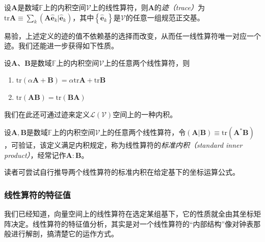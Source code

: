 \documentclass[main.tex]{subfiles}
\begin{document}
\begin{definition}[线性算符的迹]\label{def:II.2.19}
    设$\mathbf{A}$是数域$\mathbb{F}$上的内积空间$\mathcal{V}$上的线性算符，则$\mathbf{A}$的\emph{迹（trace）}为$\mathrm{tr}\mathbf{A}\equiv\sum_k\left(\mathbf{A}\mathbf{\hat{e}}_k|\mathbf{\hat{e}}_k\right)$，其中$\left\{\mathbf{\hat{e}}_k\right\}$是$\mathcal{V}$的任意一组规范正交基。
\end{definition}

易验，上述定义的迹的值不依赖基的选择而改变，从而任一线性算符唯一对应一个迹。我们还能进一步获得如下性质。

\begin{theorem}\label{thm:II.2.25}
    设$\mathbf{A}$、$\mathbf{B}$是数域$\mathbb{F}$上的内积空间$\mathcal{V}$上的任意两个线性算符，则
    \begin{enumerate}
        \item $\mathrm{tr}\left(\alpha\mathbf{A}+\mathbf{B}\right)=\alpha\mathrm{tr}\mathbf{A}+\mathrm{tr}\mathbf{B}$
        \item $\mathrm{tr}\left(\mathbf{AB}\right)=\mathrm{tr}\left(\mathbf{BA}\right)$
    \end{enumerate}
\end{theorem}

我们在此还可通过迹来定义$\mathcal{L}\left(\mathcal{V}\right)$空间上的一种内积。

\begin{definition}[线性算符的标准内积]\label{def:II.2.20}
    设$\mathbf{A},\mathbf{B}$是数域$\mathbb{F}$上的内积空间$\mathcal{V}$上的任意两个线性算符，令$\left(\mathbf{A}|\mathbf{B}\right)\equiv\mathrm{tr}\left(\mathbf{A}^*\mathbf{B}\right)$，可验证，该定义满足内积规定，称为线性算符的\emph{标准内积（standard inner product）}，经常记作$\mathbf{A}:\mathbf{B}$。
\end{definition}

读者可尝试自行推导两个线性算符的标准内积在给定基下的坐标运算公式。
\subsubsection{线性算符的特征值}
我们已经知道，向量空间上的线性算符在选定某组基下，它的性质就全由其坐标矩阵决定。线性算符的特征值分析，其实是对一个线性算符的“内部结构”像对钟表那般进行解剖，搞清楚它的运作方式。
\end{document}
